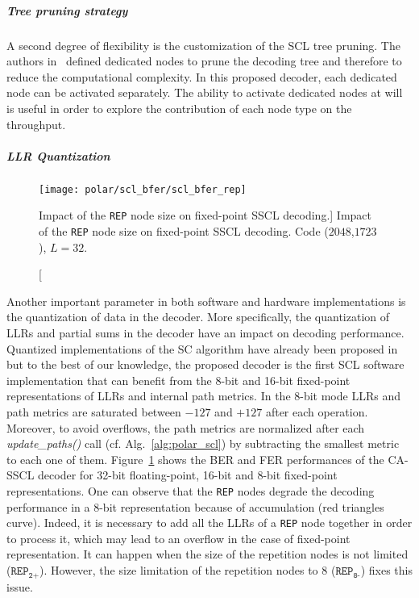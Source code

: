 \subparagraph{Tree pruning strategy}

A second degree of flexibility is the customization of the SCL tree pruning. The
authors in~\cite{Alamdar-Yazdi2011,Sarkis2016} defined dedicated nodes to prune
the decoding tree and therefore to reduce the computational complexity. In this
proposed decoder, each dedicated node can be activated separately. The ability
to activate dedicated nodes at will is useful in order to explore the
contribution of each node type on the throughput.

\subparagraph{LLR Quantization}

\begin{figure}[htp]
  \centering
  \texttt{[image: polar/scl\_bfer/scl\_bfer\_rep]}
  \caption
    [Impact of the \texttt{REP} node size on fixed-point SSCL decoding.]
    {Impact of the \texttt{REP} node size on fixed-point SSCL decoding.
    Code ($2048$,$1723$), $L=32$.}
  \label{plot:polar_scl_bfer_rep}
\end{figure}

Another important parameter in both software and hardware implementations is the
quantization of data in the decoder. More specifically, the quantization of LLRs
and partial sums in the decoder have an impact on decoding performance.
Quantized implementations of the SC algorithm have already been proposed
in~\cite{Giard2016} but to the best of our knowledge, the proposed decoder is
the first SCL software implementation that can benefit from the 8-bit and 16-bit
fixed-point representations of LLRs and internal path metrics. In the 8-bit mode
LLRs and path metrics are saturated between $-127$ and $+127$ after each
operation. Moreover, to avoid overflows, the path metrics are normalized after
each \textit{update\_paths()} call (cf. Alg.~\ref{alg:polar_scl}) by subtracting
the smallest metric to each one of them. Figure~\ref{plot:polar_scl_bfer_rep}
shows the BER and FER performances of the CA-SSCL decoder for 32-bit
floating-point, 16-bit and 8-bit fixed-point representations. One can observe
that the \verb|REP| nodes degrade the decoding performance in a 8-bit
representation because of accumulation (red triangles curve). Indeed, it is
necessary to add all the LLRs of a \verb|REP| node together in order to process
it, which may lead to an overflow in the case of fixed-point representation. It
can happen when the size of the repetition nodes is not limited
($\texttt{REP}_\texttt{2+}$). However, the size limitation of the repetition
nodes to 8 ($\texttt{REP}_\texttt{8-}$) fixes this issue.

